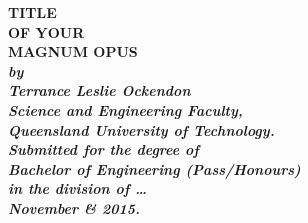 \begin{titlepage}
\renewcommand{\baselinestretch}{1.0}
\begin{center}
\vspace*{35mm}
\Huge\bf
		TITLE\\
		OF YOUR\\
		MAGNUM OPUS\\
\vspace{20mm}
\large\sl
		by\\
		Terrance Leslie Ockendon
		\medskip\\
\rm
		Science and Engineering Faculty,\\
		Queensland University of Technology.\\
\vspace{30mm}
		Submitted for the degree of\\
		Bachelor of Engineering (Pass/Honours)
		\smallskip\\
\normalsize
		in the division of \ldots
		\medskip\\
\large
		November \& 2015.		
\end{center}
\end{titlepage}